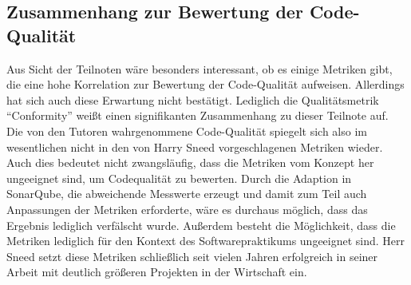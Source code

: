 \documentclass[da,ngerman]{stthesis}
\begin{document}
  			\subsection{Zusammenhang zur Bewertung der Code-Qualität}
  				Aus Sicht der Teilnoten wäre besonders interessant, ob es einige Metriken gibt, die eine hohe Korrelation zur Bewertung der Code-Qualität aufweisen. Allerdings hat sich auch diese Erwartung nicht bestätigt. Lediglich die Qualitätsmetrik "`Conformity"' weißt einen signifikanten Zusammenhang zu dieser Teilnote auf. Die von den Tutoren wahrgenommene Code-Qualität spiegelt sich also im wesentlichen nicht in den von Harry Sneed vorgeschlagenen Metriken wieder. Auch dies bedeutet nicht zwangsläufig, dass die Metriken vom Konzept her ungeeignet sind, um Codequalität zu bewerten. Durch die Adaption in SonarQube, die abweichende Messwerte erzeugt und damit zum Teil auch Anpassungen der Metriken erforderte, wäre es durchaus möglich, dass das Ergebnis lediglich verfälscht wurde. Außerdem besteht die Möglichkeit, dass die Metriken lediglich für den Kontext des Softwarepraktikums ungeeignet sind. Herr Sneed setzt diese Metriken schließlich seit vielen Jahren erfolgreich in seiner Arbeit mit deutlich größeren Projekten in der Wirtschaft ein.
\end{document}
